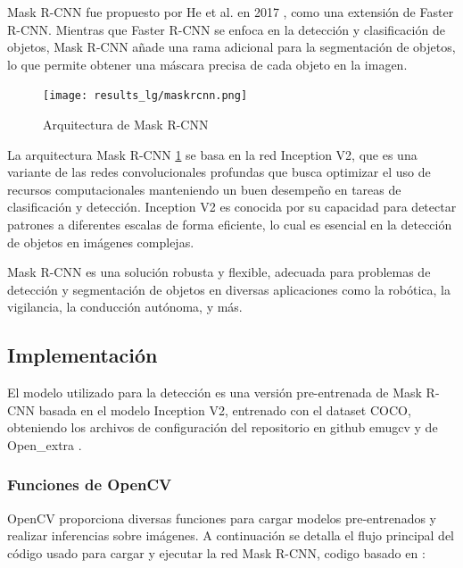 \documentclass{article}
\begin{document}
Mask R-CNN fue propuesto por He et al. en 2017 \cite{he2018maskrcnn}, como una extensión de Faster R-CNN. Mientras que Faster R-CNN \cite{girshick2015fastrcnn} 
se enfoca en la detección y clasificación de objetos, Mask R-CNN añade una rama adicional para la segmentación de objetos, lo que permite obtener una máscara precisa de 
cada objeto en la imagen.

\begin{figure}[!ht]
    \centering
    \texttt{[image: results\_lg/maskrcnn.png]}
    \caption{Arquitectura de Mask R-CNN}
    \label{fig:mask_rcnn}
\end{figure}

La arquitectura Mask R-CNN \ref{fig:mask_rcnn} se basa en la red Inception V2, que es una variante de las redes convolucionales profundas que busca optimizar el uso
de recursos computacionales manteniendo un buen desempeño en tareas de clasificación y detección. Inception V2 es conocida por su capacidad para 
detectar patrones a diferentes escalas de forma eficiente, lo cual es esencial en la detección de objetos en imágenes complejas.

Mask R-CNN es una solución robusta y flexible, adecuada para problemas de detección y segmentación de objetos en diversas aplicaciones como 
la robótica, la vigilancia, la conducción autónoma, y más.

\subsection{Implementación}
El modelo utilizado para la detección es una versión pre-entrenada de Mask R-CNN basada en el modelo Inception V2, entrenado con el dataset COCO, obteniendo
los archivos de configuración del repositorio en github emugcv\cite{emgucv_models} y de Open\_extra \cite{opencv_extra}.
\subsubsection{Funciones de OpenCV}
OpenCV proporciona diversas funciones para cargar modelos pre-entrenados y realizar inferencias sobre imágenes. A continuación se detalla el flujo 
principal del código usado para cargar y ejecutar la red Mask R-CNN, codigo basado en \cite{canu2021instance}:
\end{document}
